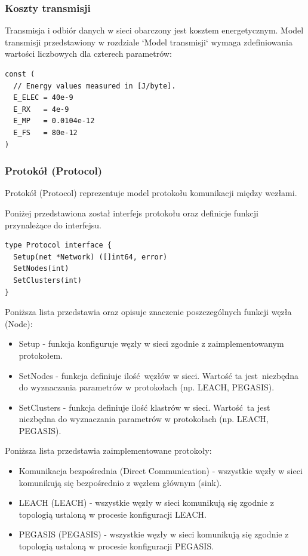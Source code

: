 \documentclass[a4paper,12pt,twoside,openany]{report}
\begin{document}
\subsubsection{Koszty transmisji}

Transmisja i odbiór danych w sieci obarczony jest kosztem energetycznym.
Model transmisji przedstawiony w rozdziale `Model transmisji` wymaga zdefiniowania wartości liczbowych dla czterech parametrów:

\begin{lstlisting}
const (
  // Energy values measured in [J/byte].
  E_ELEC = 40e-9
  E_RX   = 4e-9
  E_MP   = 0.0104e-12
  E_FS   = 80e-12
)
\end{lstlisting}

\subsubsection{Protokół (Protocol)}

Protokół (Protocol) reprezentuje model protokołu komunikacji między wezłami.

Poniżej przedstawiona został interfejs protokołu oraz definicje funkcji przynależące do interfejsu.

\begin{lstlisting}
type Protocol interface {
  Setup(net *Network) ([]int64, error)
  SetNodes(int)
  SetClusters(int)
}
\end{lstlisting}

Poniższa lista przedstawia oraz opisuje znaczenie poszczególnych funkcji węzła (Node):

\begin{itemize}
 \item Setup - funkcja konfiguruje węzły w sieci zgodnie z zaimplementowanym protokołem.
 \item SetNodes - funkcja definiuje ilość węzłów w sieci. Wartość ta jest niezbędna do wyznaczania parametrów w protokołach (np. LEACH, PEGASIS).
 \item SetClusters - funkcja definiuje ilość klastrów w sieci. Wartość ta jest niezbędna do wyznaczania parametrów w protokołach (np. LEACH, PEGASIS).
\end{itemize}

Poniższa lista przedstawia zaimplementowane protokoły:

\begin{itemize}
 \item Komunikacja bezpośrednia	(Direct Communication) - wszystkie węzły w sieci komunikują się bezpośrednio z węzłem głównym (sink).
 \item LEACH (LEACH) - wszystkie węzły w sieci komunikują się zgodnie z topologią ustaloną w procesie konfiguracji LEACH.
 \item PEGASIS (PEGASIS) - wszystkie węzły w sieci komunikują się zgodnie z topologią ustaloną w procesie konfiguracji PEGASIS.
\end{itemize}
\end{document}
